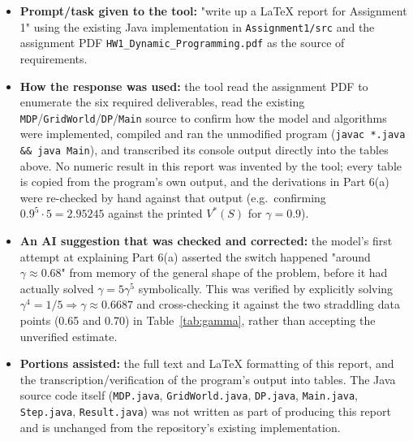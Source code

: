 \documentclass[11pt]{article}
\begin{document}
\begin{itemize}
  \item \textbf{Prompt/task given to the tool:} "write up a LaTeX report for
  Assignment 1" using the existing Java implementation in
  \texttt{Assignment1/src} and the assignment PDF
  \texttt{HW1\_Dynamic\_Programming.pdf} as the source of requirements.
  \item \textbf{How the response was used:} the tool read the assignment PDF
  to enumerate the six required deliverables, read the existing
  \texttt{MDP}/\texttt{GridWorld}/\texttt{DP}/\texttt{Main} source to confirm
  how the model and algorithms were implemented, compiled and ran the
  unmodified program (\texttt{javac *.java \&\& java Main}), and transcribed
  its console output directly into the tables above. No numeric result in
  this report was invented by the tool; every table is copied from the
  program's own output, and the derivations in Part 6(a) were re-checked by
  hand against that output (e.g.\ confirming $0.9^5 \cdot 5 = 2.95245$
  against the printed $V^\ast(S)$ for $\gamma=0.9$).
  \item \textbf{An AI suggestion that was checked and corrected:} the model's
  first attempt at explaining Part 6(a) asserted the switch happened "around
  $\gamma \approx 0.68$" from memory of the general shape of the problem,
  before it had actually solved $\gamma = 5\gamma^5$ symbolically. This was
  verified by explicitly solving $\gamma^4 = 1/5 \Rightarrow \gamma \approx
  0.6687$ and cross-checking it against the two straddling data points
  (0.65 and 0.70) in Table~\ref{tab:gamma}, rather than accepting the
  unverified estimate.
  \item \textbf{Portions assisted:} the full text and LaTeX formatting of
  this report, and the transcription/verification of the program's output
  into tables. The Java source code itself
  (\texttt{MDP.java}, \texttt{GridWorld.java}, \texttt{DP.java},
  \texttt{Main.java}, \texttt{Step.java}, \texttt{Result.java}) was not
  written as part of producing this report and is unchanged from the
  repository's existing implementation.
\end{itemize}
\end{document}
